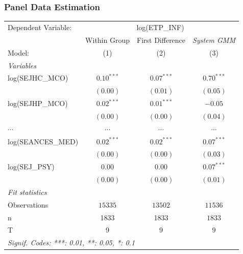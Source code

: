 \documentclass[10pt,mathserif,aspectratio=169]{beamer}
\begin{document}
\begin{frame}
  \frametitle{Panel Data Estimation}
  \begin{table}\fontsize{6pt}{8pt}\selectfont
    \begingroup
    \centering
    \begin{tabular}{lccc}
      \tabularnewline \midrule \midrule
      Dependent Variable: & \multicolumn{3}{c}{log(ETP\_INF)}                                          \\
                          & Within Group                      & First Difference & \textit{System GMM} \\
      Model:              & (1)                               & (2)              & (3)                 \\
      \midrule
      \emph{Variables}                                                                                 \\
      log(SEJHC\_MCO)     & $0.10^{***}$                      & $0.07^{***}$     & $0.70^{***}$        \\
                          & $(0.00)$                          & $(0.01)$         & $(0.05)$            \\
      log(SEJHP\_MCO)     & $0.02^{***}$                      & $0.01^{***}$     & $-0.05$             \\
                          & $(0.00)$                          & $(0.00)$         & $(0.04)$            \\
      $\cdots$            & $\cdots$                          & $\cdots$         & $\cdots$            \\
      log(SEANCES\_MED)   & $0.02^{***}$                      & $0.02^{***}$     & $0.07^{***}$        \\
                          & $(0.00)$                          & $(0.00)$         & $(0.03)$            \\

      log(SEJ\_PSY)       & $0.00$                            & $0.00$           & $0.07^{***}$        \\  & $(0.00)$ & $(0.00)$ &
      $(0.01)$                                                                                         \\ \midrule \emph{Fit statistics} \\ Observations & $15335$                     & $13502$
                          & $11536$                                                                    \\

      n                   & 1833                              & 1833             & $1833$              \\ T & 9 & 9 & $9$ \\ \midrule \midrule
      \multicolumn{4}{l}{\emph{Signif. Codes: ***: 0.01, **: 0.05, *: 0.1}}                            \\
    \end{tabular}
    \par\endgroup
  \end{table}
\end{frame}
\end{document}
